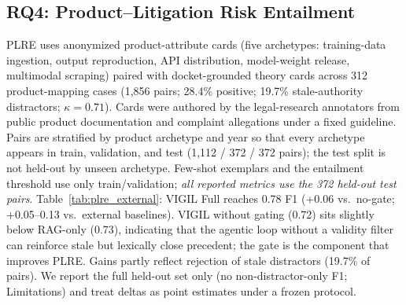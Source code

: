 \subsection{RQ4: Product--Litigation Risk Entailment}

PLRE uses anonymized product-attribute cards (five archetypes: training-data ingestion, output reproduction, API distribution, model-weight release, multimodal scraping) paired with docket-grounded theory cards across 312 product-mapping cases (1{,}856 pairs; 28.4\% positive; 19.7\% stale-authority distractors; $\kappa=0.71$). Cards were authored by the legal-research annotators from public product documentation and complaint allegations under a fixed guideline. Pairs are stratified by product archetype and year so that every archetype appears in train, validation, and test (1{,}112 / 372 / 372 pairs); the test split is not held-out by unseen archetype. Few-shot exemplars and the entailment threshold use only train/validation; \emph{all reported metrics use the 372 held-out test pairs}. Table~\ref{tab:plre_external}: VIGIL Full reaches 0.78 F1 (+0.06 vs.\ no-gate; +0.05--0.13 vs.\ external baselines). VIGIL without gating (0.72) sits slightly below RAG-only (0.73), indicating that the agentic loop without a validity filter can reinforce stale but lexically close precedent; the gate is the component that improves PLRE. Gains partly reflect rejection of stale distractors (19.7\% of pairs). We report the full held-out set only (no non-distractor-only F1; Limitations) and treat deltas as point estimates under a frozen protocol.

\begin{table}[t]
\centering
\caption{PLRE comparison against external legal-NLI and precedent-retrieval baselines. External systems do not use VIGIL's goal predicate or validity-interval closure. Held-out test pairs only.}
\label{tab:plre_external}
\small
\setlength{\tabcolsep}{4pt}
\end{table}


